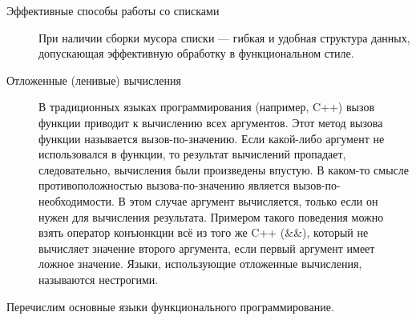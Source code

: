 \documentclass[a4paper]{article}
\begin{document}
\begin{description}
\item[Эффективные способы работы со списками] При наличии сборки
  мусора списки --- гибкая и удобная структура данных, допускающая
  эффективную обработку в функциональном стиле.
\item[Отложенные (ленивые) вычисления] В традиционных языках
  программирования (например, C++) вызов функции приводит к вычислению
  всех аргументов. Этот метод вызова функции называется
  вызов-по-значению. Если какой-либо аргумент не использовался в
  функции, то результат вычислений пропадает, следовательно,
  вычисления были произведены впустую. В каком-то смысле
  противоположностью вызова-по-значению является
  вызов-по-необходимости. В этом случае аргумент вычисляется, только
  если он нужен для вычисления результата. Примером такого поведения
  можно взять оператор конъюнкции всё из того же C++ (\&\&), который не
  вычисляет значение второго аргумента, если первый аргумент имеет
  ложное значение. Языки, использующие отложенные вычисления,
  называются нестрогими.
\end{description}

Перечислим основные языки функционального программирование.
\end{document}
